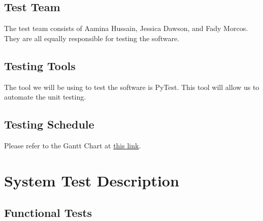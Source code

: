 \documentclass[12pt, titlepage]{article}
\begin{document}
\subsection{Test Team}
The test team consists of Aamina Hussain, Jessica Dawson, and Fady Morcos. They are all equally responsible for testing the software.
\subsection{Testing Tools}
The tool we will be using to test the software is PyTest. This tool will allow us to automate the unit testing.
\subsection{Testing Schedule}
Please refer to the Gantt Chart at
\href{https://gitlab.cas.mcmaster.ca/3xa3-l3-g10/3xa3-l3-g10/-/tree/main/ProjectSchedule}{this link}.

\section{System Test Description}
	
\subsection{Functional Tests}
\end{document}
